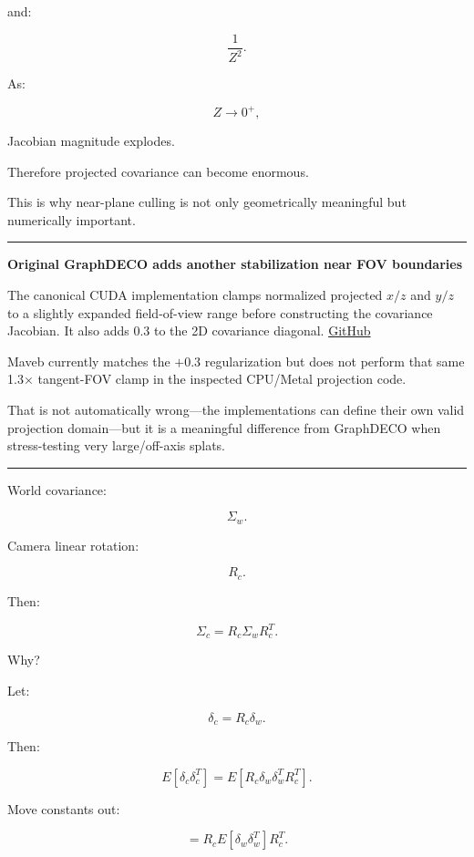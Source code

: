 and:

\[
\frac1{Z^2}.
\]

As:

\[
Z\rightarrow0^+,
\]

Jacobian magnitude explodes.

Therefore projected covariance can become enormous.

This is why near-plane culling is not only geometrically meaningful but numerically important.

\begin{center}\rule{0.5\linewidth}{0.5pt}\end{center}

\textbf{Original GraphDECO adds another stabilization near FOV boundaries}

The canonical CUDA implementation clamps normalized projected \(x/z\) and \(y/z\) to a slightly expanded field-of-view range before constructing the covariance Jacobian. It also adds \(0.3\) to the 2D covariance diagonal. \href{https://github.com/graphdeco-inria/diff-gaussian-rasterization/blob/main/cuda_rasterizer/forward.cu?utm_source=chatgpt.com}{GitHub}

Maveb currently matches the \(+0.3\) regularization but does not perform that same 1.3× tangent-FOV clamp in the inspected CPU/Metal projection code.

That is not automatically wrong---the implementations can define their own valid projection domain---but it is a meaningful difference from GraphDECO when stress-testing very large/off-axis splats.

\begin{center}\rule{0.5\linewidth}{0.5pt}\end{center}

World covariance:

\[
\Sigma_w.
\]

Camera linear rotation:

\[
R_c.
\]

Then:

\[
\boxed{
\Sigma_c
=
R_c
\Sigma_w
R_c^T.
}
\]

Why?

Let:

\[
\delta_c
=
R_c\delta_w.
\]

Then:

\[
E[
\delta_c
\delta_c^T
]
=
E[
R_c
\delta_w
\delta_w^T
R_c^T
].
\]

Move constants out:

\[
=
R_c
E[
\delta_w\delta_w^T
]
R_c^T.
\]

